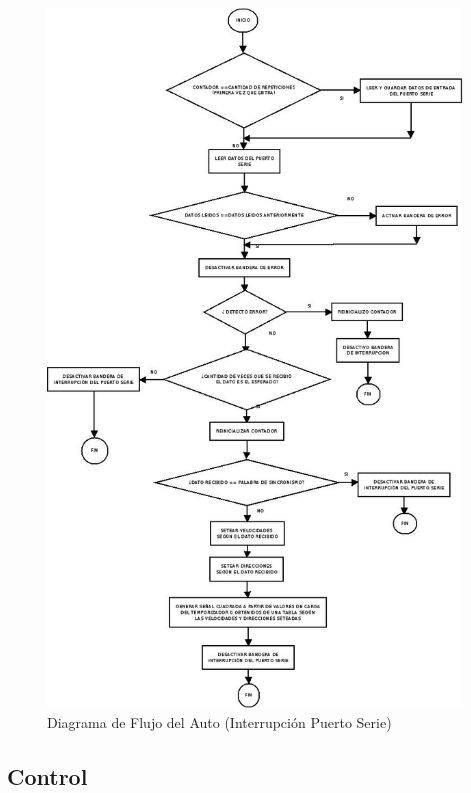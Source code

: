 \documentclass[a4paper,10pt]{article}
\begin{document}
				\newpage
				\begin{figure}[!htb]
					\centering
					\includegraphics[width=11cm]{Imagenes/DiagFlujoAuto1.jpg}
					\caption{Diagrama de Flujo del Auto (Interrupción Puerto Serie)} \label{AutoFlujo2}
				\end{figure}

	\vspace{1cm}
				\subsection{Control}
					
\end{document}
